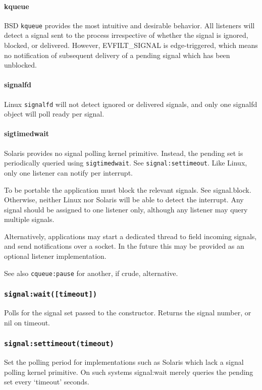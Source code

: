 \documentclass[11pt, oneside]{memoir}
\newcommand*{\syscall}[1]{\texttt{#1}\xspace}
\newcommand*{\routine}[1]{\texttt{#1}\xspace}
\newcommand*{\fn}[1]{\texttt{#1}\xspace}
\newcommand*{\method}[1]{\texttt{#1}\xspace}
\begin{document}
\paragraph{kqueue}
BSD \syscall{kqueue} provides the most intuitive and desirable behavior. All listeners will detect a signal sent to the process irrespective of whether the signal is ignored, blocked, or delivered. However, EVFILT\_SIGNAL is edge-triggered, which means no notification of subsequent delivery of a pending signal which has been unblocked.

\paragraph{signalfd}
Linux \syscall{signalfd} will not detect ignored or delivered signals, and only one signalfd object will poll ready per signal.

\paragraph{sigtimedwait}
Solaris provides no signal polling kernel primitive. Instead, the pending set is periodically queried using \syscall{sigtimedwait}. See \method{signal:settimeout}. Like Linux, only one listener can notify per interrupt.

To be portable the application must block the relevant signals. See signal.block. Otherwise, neither Linux nor Solaris will be able to detect the interrupt. Any signal should be assigned to one listener only, although any listener may query multiple signals.

Alternatively, applications may start a dedicated thread to field incoming signals, and send notifications over a socket. In the future this may be provided as an optional listener implementation.

See also \routine{cqueue:pause} for another, if crude, alternative.

\subsubsection[\fn{signal:wait}]{\fn{signal:wait([timeout])}}
Polls for the signal set passed to the constructor. Returns the signal number, or nil on timeout.

\subsubsection[\fn{signal:settimeout}]{\fn{signal:settimeout(timeout)}}
Set the polling period for implementations such as Solaris which lack a signal polling kernel primitive. On such systems signal:wait merely queries the pending set every `timeout' seconds.
\end{document}
